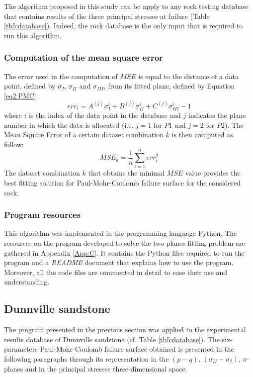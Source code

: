 The algorithm proposed in this study can be apply to any rock testing database that contains results of the three principal stresses at failure (Table \ref{tb5:database}). Indeed, the rock database is the only input that is required to run this algorithm. 

\subsubsection{Computation of the mean square error}

The error used in the computation of $MSE$ is equal to the distance of a data point, defined by $\sigma_I$, $\sigma_{II}$ and $\sigma_{III}$, from its fitted plane, defined by Equation \ref{eq2:PMC}:
\begin{equation}\label{eq5:error}
    err_{i} = A^{(j)}\sigma_I^{i}+B^{(j)}\sigma_{II}^{i}+C^{(j)}\sigma_{III}^{i} - 1
\end{equation}
where $i$ is the index of the data point in the database and $j$ indicates the plane number in which the data is allocated (i.e. $j=1$ for $P1$ and $j=2$ for $P2$). The Mean Square Error of a certain dataset combination $k$ is then computed as follow:
\begin{equation}\label{eq5:MSE}
    MSE_k = \frac{1}{n}\sum_{i=1}^{n} err_i^2
\end{equation}
The dataset combination $k$ that obtains the minimal $MSE$ value provides the best fitting solution for Paul-Mohr-Coulomb failure surface for the considered rock. 

\subsubsection{Program resources}

This algorithm was implemented in the programming language Python. The resources on the program developed to solve the two planes fitting problem are gathered in Appendix \ref{App:C}. It contains the Python files required to run the program and a \emph{README} document that explains how to use the program. Moreover, all the code files are commented in detail to ease their use and understanding.  

\subsection{Dunnville sandstone}

The program presented in the previous section was applied to the experimental results database of Dunnville sandstone (cf. Table \ref{tb5:database}). The six-parameters Paul-Mohr-Coulomb failure surface obtained is presented in the following paragraphs through its representation in the $(p-q)$, $(\sigma_{II}-\sigma_I)$, $\pi$- planes and in the principal stresses three-dimensional space. 


